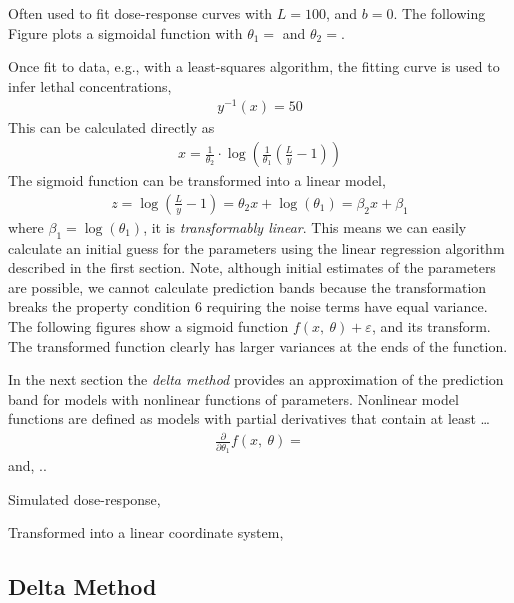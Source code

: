 Often used to fit dose-response curves with \(L = 100\), and \(b = 0\).
The following Figure plots a sigmoidal function with \(\theta_{1} =\)
and \(\theta_{2} =\).


Once fit to data, e.g., with a least-squares algorithm, the fitting
curve is used to infer lethal concentrations,
\begin{align}
y^{- 1}(x) = 50
\end{align}
This can be calculated directly as
\begin{align}
x = \frac{1}{\theta_{2}} \cdot \log\left( \frac{1}{\theta_{1}}\left( \frac{L}{y} - 1 \right) \right)
\end{align}
The sigmoid function can be transformed into a linear model,
\begin{align}
z = \log\left( \frac{L}{y} - 1 \right) = \theta_{2}x + \log(\theta_{1}) = \beta_{2}x + \beta_{1}
\end{align}
where \(\beta_{1} = \log{(\theta_{1})}\), it is \emph{transformably
linear}. This means we can easily calculate an initial guess for the
parameters using the linear regression algorithm described in the first
section. Note, although initial estimates of the parameters are
possible, we cannot calculate prediction bands because the
transformation breaks the property condition 6 requiring the noise terms
have equal variance. The following figures show a sigmoid function
\(f(x,\ \theta) + \varepsilon\), and its transform. The transformed
function clearly has larger variances at the ends of the function.

In the next section the \emph{delta method} provides an approximation of
the prediction band for models with nonlinear functions of parameters.
Nonlinear model functions are defined as models with partial derivatives
that contain at least \ldots{}
\begin{align}
\frac{\partial}{\partial\theta_{1}}f(x,\ \theta) =
\end{align}
and, ..

Simulated dose-response,


Transformed into a linear coordinate system,


\subsection{Delta Method}


